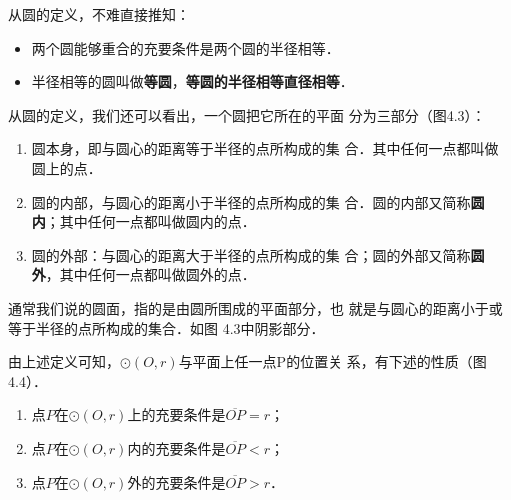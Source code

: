 从圆的定义，不难直接推知：
\begin{itemize}
    \item 两个圆能够重合的充要条件是两个圆的半径相等．
    \item 半径相等的圆叫做\textbf{等圆}，\textbf{等圆的半径相等直径相等}．
\end{itemize}

从圆的定义，我们还可以看出，一个圆把它所在的平面
分为三部分（图4.3）：
\begin{enumerate}
    \item 圆本身，即与圆心的距离等于半径的点所构成的集
合．其中任何一点都叫做圆上的点．
\item 圆的内部，与圆心的距离小于半径的点所构成的集
合．圆的内部又简称\textbf{圆内}；其中任何一点都叫做圆内的点．
\item 圆的外部：与圆心的距离大于半径的点所构成的集
合；圆的外部又简称\textbf{圆外}，其中任何一点都叫做圆外的点．
\end{enumerate}

\begin{figure}[htp]\centering
    \begin{minipage}[t]{0.48\textwidth}
    \centering
{}
    \caption{}
    \end{minipage}
    \begin{minipage}[t]{0.48\textwidth}
    \centering
    \caption{}
    \end{minipage}
    \end{figure}

通常我们说的圆面，指的是由圆所围成的平面部分，也
就是与圆心的距离小于或等于半径的点所构成的集合．如图
4.3中阴影部分．

由上述定义可知，$\odot(O,r)$与平面上任一点P的位置关
系，有下述的性质（图4.4）．
\begin{enumerate}
    \item 点$P$在$\odot(O,r)$上的充要条件是$\overline{OP}=r$；
    \item 点$P$在$\odot(O,r)$内的充要条件是$\overline{OP}<r$；
    \item 点$P$在$\odot(O,r)$外的充要条件是$\overline{OP}>r$．
\end{enumerate}

